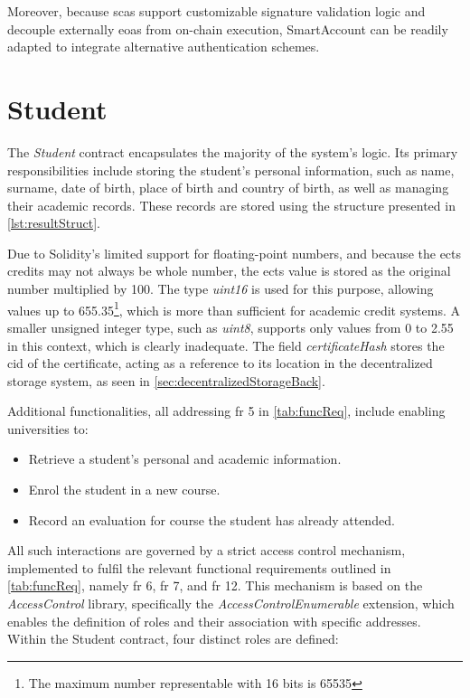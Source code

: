 Moreover, because \gls{sca}s support customizable signature validation logic and decouple externally \gls{eoa}s from on-chain execution, SmartAccount can be readily adapted to integrate alternative authentication schemes.

\section{Student}
\label{sec:studentContract}
The \textit{Student} contract encapsulates the majority of the system's logic. Its primary responsibilities include storing the student's personal information, such as name, surname, date of birth, place of birth and country of birth, as well as managing their academic records. These records are stored using the structure presented in \cref{lst:resultStruct}. 

Due to Solidity's limited support for floating-point numbers, and because the \gls{ects} credits may not always be whole number, the \gls{ects} value is stored as the original number multiplied by 100. The type \textit{uint16} is used for this purpose, allowing values up to 655.35\footnote{The maximum number representable with 16 bits is 65535},  which is more than sufficient for academic credit systems. A smaller unsigned integer type, such as \textit{uint8}, supports only values from 0 to 2.55 in this context, which is clearly inadequate. The field \textit{certificateHash} stores the \gls{cid} of the certificate, acting as a reference to its location in the decentralized storage system, as seen in \cref{sec:decentralizedStorageBack}. 

Additional functionalities, all addressing \gls{fr} 5 in \cref{tab:funcReq}, include enabling universities to:
\begin{itemize}
    \item Retrieve a student's personal and academic information.
    \item Enrol the student in a new course.
    \item Record an evaluation for course the student has already attended.
\end{itemize}
All such interactions are governed by a strict access control mechanism, implemented to fulfil the relevant functional requirements outlined in \cref{tab:funcReq}, namely \gls{fr} 6, \gls{fr} 7, and \gls{fr} 12. This mechanism is based on the \textit{AccessControl} library, specifically the \textit{AccessControlEnumerable} extension, which enables the definition of roles and their association with specific addresses. Within the Student contract, four distinct roles are defined:

